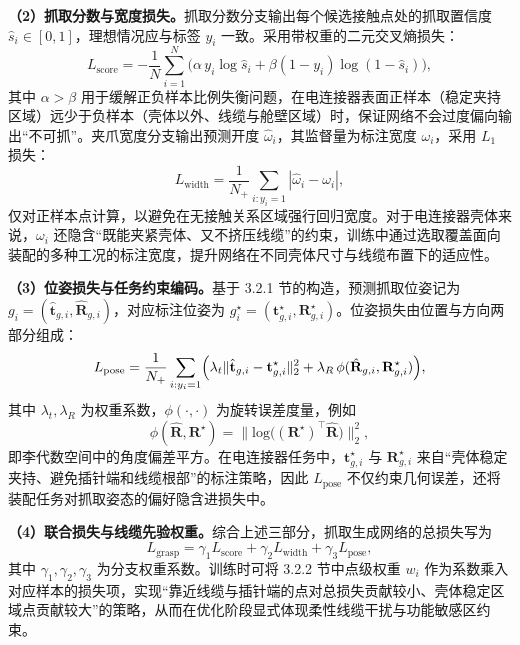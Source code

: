 \textbf{（2）抓取分数与宽度损失。}抓取分数分支输出每个候选接触点处的抓取置信度 $\hat{s}_i\in[0,1]$，理想情况应与标签 $y_i$ 一致。采用带权重的二元交叉熵损失：
\begin{equation}
  L_{\mathrm{score}}=
  -\frac{1}{N}\sum_{i=1}^{N}
  \bigl(\alpha\,y_i\log\hat{s}_i+\beta(1-y_i)\log(1-\hat{s}_i)\bigr),
  \label{eq:ch3:Lscore}
\end{equation}
其中 $\alpha>\beta$ 用于缓解正负样本比例失衡问题，在电连接器表面正样本（稳定夹持区域）远少于负样本（壳体以外、线缆与舱壁区域）时，保证网络不会过度偏向输出“不可抓”。夹爪宽度分支输出预测开度 $\hat{\omega}_i$，其监督量为标注宽度 $\omega_i$，采用 $L_1$ 损失：
\begin{equation}
  L_{\mathrm{width}}=
  \frac{1}{N_+}\sum_{i:y_i=1}|\hat{\omega}_i-\omega_i|,
  \label{eq:ch3:Lwidth}
\end{equation}
仅对正样本点计算，以避免在无接触关系区域强行回归宽度。对于电连接器壳体来说，$\omega_i$ 还隐含“既能夹紧壳体、又不挤压线缆”的约束，训练中通过选取覆盖面向装配的多种工况的标注宽度，提升网络在不同壳体尺寸与线缆布置下的适应性。

\textbf{（3）位姿损失与任务约束编码。}基于 3.2.1 节的构造，预测抓取位姿记为 $g_i=(\hat{\mathbf{t}}_{g,i},\hat{\mathbf{R}}_{g,i})$，对应标注位姿为 $g_i^\star=(\mathbf{t}_{g,i}^\star,\mathbf{R}_{g,i}^\star)$。位姿损失由位置与方向两部分组成：
\begin{equation}
  L_{\mathrm{pose}}=
  \frac{1}{N_+}\sum_{i:y_i=1}
  \Bigl(\lambda_t\|\hat{\mathbf{t}}_{g,i}-\mathbf{t}_{g,i}^\star\|_2^2
  +\lambda_R\,\phi(\hat{\mathbf{R}}_{g,i},\mathbf{R}_{g,i}^\star)\Bigr),
  \label{eq:ch3:Lpose}
\end{equation}
其中 $\lambda_t,\lambda_R$ 为权重系数，$\phi(\cdot,\cdot)$ 为旋转误差度量，例如
\begin{equation}
  \phi(\hat{\mathbf{R}},\mathbf{R}^\star)=
  \bigl\|\mathrm{log}\bigl((\mathbf{R}^\star)^{\top}\hat{\mathbf{R}}\bigr)\bigr\|_2^2,
  \label{eq:ch3:RotErr}
\end{equation}
即李代数空间中的角度偏差平方。在电连接器任务中，$\mathbf{t}_{g,i}^\star$ 与 $\mathbf{R}_{g,i}^\star$ 来自“壳体稳定夹持、避免插针端和线缆根部”的标注策略，因此 $L_{\mathrm{pose}}$ 不仅约束几何误差，还将装配任务对抓取姿态的偏好隐含进损失中。

\textbf{（4）联合损失与线缆先验权重。}综合上述三部分，抓取生成网络的总损失写为
\begin{equation}
  L_{\mathrm{grasp}}=
  \gamma_1L_{\mathrm{score}}+\gamma_2L_{\mathrm{width}}+\gamma_3L_{\mathrm{pose}},
  \label{eq:ch3:Ltotal}
\end{equation}
其中 $\gamma_1,\gamma_2,\gamma_3$ 为分支权重系数。训练时可将 3.2.2 节中点级权重 $w_i$ 作为系数乘入对应样本的损失项，实现“靠近线缆与插针端的点对总损失贡献较小、壳体稳定区域点贡献较大”的策略，从而在优化阶段显式体现柔性线缆干扰与功能敏感区约束。

